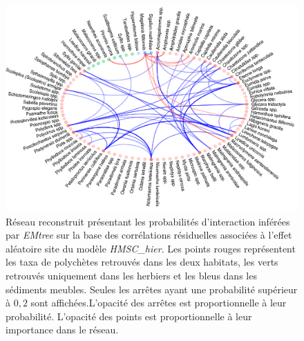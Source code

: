 \documentclass[12pt,]{article}
\makeatletter
\def\maxwidth{\ifdim\Gin@nat@width>\linewidth\linewidth
\else\Gin@nat@width\fi}
\let\Oldincludegraphics\includegraphics
\renewcommand{\includegraphics}[1]{\Oldincludegraphics[width=\maxwidth]{#1}}
\makeatother
\begin{document}
\begin{figure}
\hypertarget{fig:nethmschiersite}{%
\centering
\includegraphics{figures/hmsc-hier-site-network-1.png}
\caption{Réseau reconstruit présentant les probabilités d'interaction
inférées par \emph{EMtree} sur la base des corrélations résiduelles
associées à l'effet aléatoire site du modèle \emph{HMSC\_hier}. Les
points rouges représentent les taxa de polychètes retrouvés dans les
deux habitats, les verts retrouvés uniquement dans les herbiers et les
bleus dans les sédiments meubles. Seules les arrêtes ayant une
probabilité supérieur à \(0,2\) sont affichées.L'opacité des arrêtes est
proportionnelle à leur probabilité. L'opacité des points est
proportionnelle à leur importance dans le
réseau.}\label{fig:nethmschiersite}
}
\end{figure}
\end{document}
